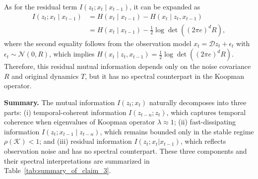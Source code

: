 \documentclass{article} %
\begin{document}
\begin{proofwithframe}

As for the residual term $I(z_t; x_t \mid x_{t-1})$, it can be expanded as
\begin{equation} \label{eq:closed_form_3}
\begin{split}
        I(z_t; x_t \mid x_{t-1}) 
        &= H(x_t \mid x_{t-1}) - H(x_t \mid z_t, x_{t-1}) \\
        &= H(x_t \mid x_{t-1}) - \tfrac{1}{2} \log \det ((2 \pi e)^d R),
\end{split}
\end{equation}
where the second equality follows from the observation model 
$x_t = \mathcal{D}z_t + \epsilon_t$ with $\epsilon_t \sim \mathcal{N}(0, R)$,
which implies 
$H(x_t \mid z_t, x_{t-1}) = \tfrac{1}{2} \log \det ((2 \pi e)^d R)$.
Therefore, this residual mutual information depends only on the noise covariance $R$ and original dynamics $T$, but it has no spectral counterpart in the Koopman operator.

\noindent\textbf{Summary.} 
The mutual information $I(z_t;x_t)$ naturally decomposes into three parts: 
(i) temporal-coherent information $I(z_{t-n};z_t)$, which captures temporal coherence when eigenvalues of Koopman operator $ \lambda \approx 1$; 
(ii) fast-dissipating information $I(z_t;x_{t-1}\mid z_{t-n})$, which remains bounded only in the stable regime $\rho(\mathcal K)<1$; and 
(iii) residual information $I(z_t;x_t | x_{t-1})$, which reflects observation noise and has no spectral counterpart. 
These three components and their spectral interpretations are summarized in Table~\ref{tab:summary_of_claim_3}.
\end{proofwithframe}
\end{document}
